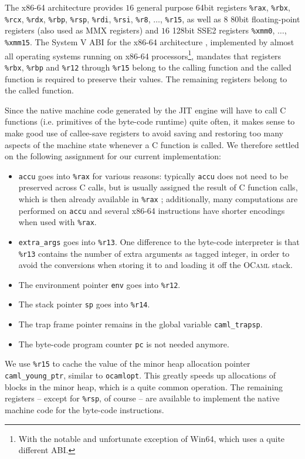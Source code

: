 \documentclass[a4paper]{acm_proc_article-sp}
\begin{document}
The x86-64 architecture \cite{Amd09Vol1,Intel10Vol1} provides $16$ general purpose 64bit registers \texttt{\%rax},
\texttt{\%rbx}, \texttt{\%rcx}, \texttt{\%rdx}, \texttt{\%rbp}, \texttt{\%rsp}, \texttt{\%rdi}, \texttt{\%rsi},
\texttt{\%r8}, $\ldots$, \texttt{\%r15}, as well as $8$ 80bit floating-point registers (also used
as MMX registers) and $16$ 128bit SSE2 registers \texttt{\%xmm0}, $\ldots$, \texttt{\%xmm15}.
The System V ABI for the x86-64 architecture \cite{Matz10}, implemented by almost all operating
systems running on x86-64 processors\footnote{With the notable and unfortunate exception of
Win64, which uses a quite different ABI.}, mandates that registers \texttt{\%rbx}, \texttt{\%rbp}
and \texttt{\%r12} through \texttt{\%r15} belong to the calling function and the called function is 
required to preserve their values. The remaining registers belong to the called function.

Since the native machine code generated by the JIT engine will have to call C functions (i.e.
primitives of the byte-code runtime) quite often, it makes sense to make good use of callee-save
registers to avoid saving and restoring too many aspects of the machine state whenever a C function
is called. We therefore settled on the following assignment for our current implementation:
\begin{itemize}
\item \texttt{accu} goes into \texttt{\%rax} for various reasons: typically \texttt{accu} does not
  need to be preserved across C calls, but is usually assigned the result of C function calls, which
  is then already available in \texttt{\%rax} \cite{Matz10}; additionally, many computations are performed on
  \texttt{accu} and several x86-64 instructions have shorter encodings when used with \texttt{\%rax}.
\item \texttt{extra\_args} goes into \texttt{\%r13}. One difference to the byte-code interpreter
  is that \texttt{\%r13} contains the number of extra arguments as tagged integer, in order to
  avoid the conversions when storing it to and loading it off the \textsc{OCaml} stack.
\item The environment pointer \texttt{env} goes into \texttt{\%r12}.
\item The stack pointer \texttt{sp} goes into \texttt{\%r14}.
\item The trap frame pointer remains in the global variable \texttt{caml\_trapsp}.
\item The byte-code program counter \texttt{pc} is not needed anymore.
\end{itemize}
We use \texttt{\%r15} to cache the value of the minor heap allocation pointer \texttt{caml\_young\_ptr},
similar to \texttt{ocamlopt}. This greatly speeds up allocations of blocks in the minor heap,
which is a quite common operation. The remaining registers -- except for \texttt{\%rsp}, of course --
are available to implement the native machine code for the byte-code instructions.
\end{document}
